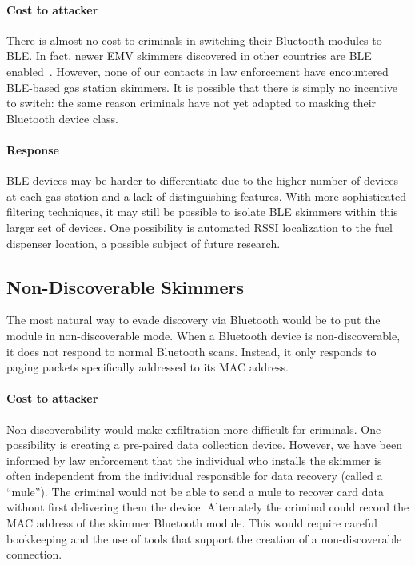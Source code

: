 \paragraph{Cost to attacker} There is almost no cost to criminals in switching their Bluetooth modules to BLE.
%
In fact, newer EMV skimmers discovered in other countries are BLE enabled~\cite{krebshimmer}.
%
However, none of our contacts in law enforcement have encountered BLE-based gas station skimmers.
%
It is possible that there is simply no incentive to switch: the same reason criminals have not yet adapted to
masking their Bluetooth device class.

\paragraph{Response} BLE devices may be harder to differentiate due to the higher number of devices at each gas
station and a lack of distinguishing features.
%
With more sophisticated filtering techniques, it may still be possible to isolate BLE skimmers within
this larger set of devices.
%
One possibility is automated RSSI localization to the fuel dispenser location, a possible subject of future research.

\subsection{Non-Discoverable Skimmers}
\label{sec:hiding:desc}

The most natural way to evade discovery via Bluetooth would be to put the module in non-discoverable mode.
%
When a Bluetooth device is non-discoverable, it does not respond to normal Bluetooth scans.
%
Instead, it only responds to paging packets specifically addressed to its MAC address.

\paragraph{Cost to attacker} Non-discoverability would make exfiltration more difficult for criminals.
%
One possibility is creating a pre-paired data collection device.
%
However, we have been informed by law enforcement that the individual who installs the skimmer is often independent
from the individual responsible for data recovery (called a ``mule'').
%
The criminal would not be able to send a mule to recover card data without first delivering them the device.
%
Alternately the criminal could record the MAC address of the skimmer Bluetooth module.
%
This would require careful bookkeeping and the use of tools that support the creation of a non-discoverable connection.

